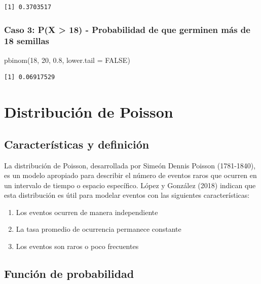 \documentclass[
  spanish,
  letterpaper,
]{book}
\newenvironment{Shaded}{\begin{snugshade}}{\end{snugshade}}
\newcommand{\AttributeTok}[1]{\textcolor[rgb]{0.40,0.45,0.13}{#1}}
\newcommand{\ConstantTok}[1]{\textcolor[rgb]{0.56,0.35,0.01}{#1}}
\newcommand{\DecValTok}[1]{\textcolor[rgb]{0.68,0.00,0.00}{#1}}
\newcommand{\FloatTok}[1]{\textcolor[rgb]{0.68,0.00,0.00}{#1}}
\newcommand{\FunctionTok}[1]{\textcolor[rgb]{0.28,0.35,0.67}{#1}}
\newcommand{\NormalTok}[1]{\textcolor[rgb]{0.00,0.23,0.31}{#1}}
\begin{document}
\begin{verbatim}
[1] 0.3703517
\end{verbatim}

\subsubsection{Caso 3: P(X \textgreater{} 18) - Probabilidad de que
germinen más de 18
semillas}\label{caso-3-px-18---probabilidad-de-que-germinen-muxe1s-de-18-semillas}

\begin{Shaded}
\begin{Highlighting}[]
\FunctionTok{pbinom}\NormalTok{(}\DecValTok{18}\NormalTok{, }\DecValTok{20}\NormalTok{, }\FloatTok{0.8}\NormalTok{, }\AttributeTok{lower.tail =} \ConstantTok{FALSE}\NormalTok{)}
\end{Highlighting}
\end{Shaded}

\begin{verbatim}
[1] 0.06917529
\end{verbatim}

\section{Distribución de Poisson}\label{distribuciuxf3n-de-poisson}

\subsection{Características y
definición}\label{caracteruxedsticas-y-definiciuxf3n-1}

La distribución de Poisson, desarrollada por Simeón Dennis Poisson
(1781-1840), es un modelo apropiado para describir el número de eventos
raros que ocurren en un intervalo de tiempo o espacio específico. López
y González (2018) indican que esta distribución es útil para modelar
eventos con las siguientes características:

\begin{enumerate}
\def\labelenumi{\arabic{enumi}.}
\item
  Los eventos ocurren de manera independiente
\item
  La tasa promedio de ocurrencia permanece constante
\item
  Los eventos son raros o poco frecuentes
\end{enumerate}

\subsection{Función de probabilidad}\label{funciuxf3n-de-probabilidad-1}
\end{document}
